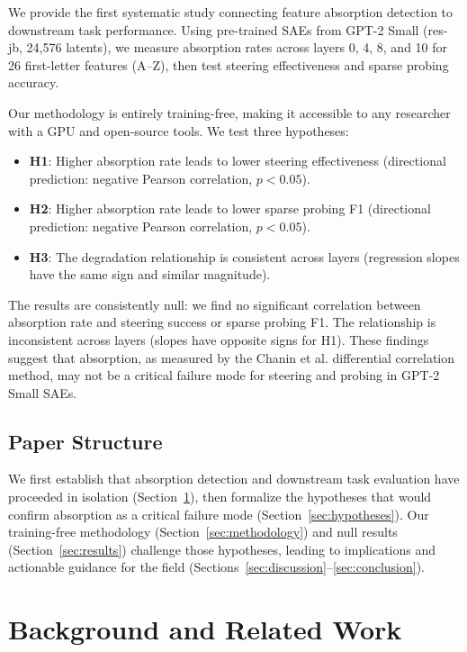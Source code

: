 \documentclass{article}
\begin{document}
We provide the first systematic study connecting feature absorption detection to downstream task performance. Using pre-trained SAEs from GPT-2 Small (res-jb, 24,576 latents), we measure absorption rates across layers 0, 4, 8, and 10 for 26 first-letter features (A--Z), then test steering effectiveness and sparse probing accuracy.

Our methodology is entirely training-free, making it accessible to any researcher with a GPU and open-source tools. We test three hypotheses:

\begin{itemize}
    \item \textbf{H1}: Higher absorption rate leads to lower steering effectiveness (directional prediction: negative Pearson correlation, $p < 0.05$).
    \item \textbf{H2}: Higher absorption rate leads to lower sparse probing F1 (directional prediction: negative Pearson correlation, $p < 0.05$).
    \item \textbf{H3}: The degradation relationship is consistent across layers (regression slopes have the same sign and similar magnitude).
\end{itemize}

The results are consistently null: we find no significant correlation between absorption rate and steering success or sparse probing F1. The relationship is inconsistent across layers (slopes have opposite signs for H1). These findings suggest that absorption, as measured by the Chanin et al. differential correlation method, may not be a critical failure mode for steering and probing in GPT-2 Small SAEs.

\subsection{Paper Structure}

We first establish that absorption detection and downstream task evaluation have proceeded in isolation (Section~\ref{sec:background}), then formalize the hypotheses that would confirm absorption as a critical failure mode (Section~\ref{sec:hypotheses}). Our training-free methodology (Section~\ref{sec:methodology}) and null results (Section~\ref{sec:results}) challenge those hypotheses, leading to implications and actionable guidance for the field (Sections~\ref{sec:discussion}--\ref{sec:conclusion}).

\section{Background and Related Work}
\label{sec:background}
\end{document}

